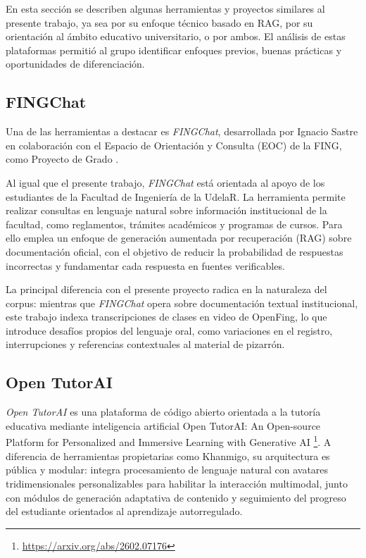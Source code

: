 En esta sección se describen algunas herramientas y proyectos similares al presente trabajo, ya sea por su enfoque técnico basado en RAG, por su orientación al ámbito educativo universitario, o por ambos. El análisis de estas plataformas permitió al grupo identificar enfoques previos, buenas prácticas y oportunidades de diferenciación.

\subsection{FINGChat}
\label{subsection:2-FINGChat}

Una de las herramientas a destacar es \textit{FINGChat}, desarrollada por Ignacio Sastre en colaboración con el Espacio de Orientación y Consulta (EOC) de la FING, como Proyecto de Grado \cite{sastre2024derivation}.

Al igual que el presente trabajo, \textit{FINGChat} está orientada al apoyo de los estudiantes de la Facultad de Ingeniería de la UdelaR. La herramienta permite realizar consultas en lenguaje natural sobre información institucional de la facultad, como reglamentos, trámites académicos y programas de cursos. Para ello emplea un enfoque de generación aumentada por recuperación (RAG) sobre documentación oficial, con el objetivo de reducir la probabilidad de respuestas incorrectas y fundamentar cada respuesta en fuentes verificables.

La principal diferencia con el presente proyecto radica en la naturaleza del corpus: mientras que \textit{FINGChat} opera sobre documentación textual institucional, este trabajo indexa transcripciones de clases en video de OpenFing, lo que introduce desafíos propios del lenguaje oral, como variaciones en el registro, interrupciones y referencias contextuales al material de pizarrón.

\subsection{Open TutorAI}
\label{subsection:2-OpenTutorAI}

\textit{Open TutorAI} es una plataforma de código abierto orientada a la tutoría educativa mediante inteligencia artificial Open {TutorAI}: An Open-source Platform for Personalized and Immersive Learning with Generative {AI} \footnote{\url{https://arxiv.org/abs/2602.07176}}. A diferencia de herramientas propietarias como Khanmigo, su arquitectura es pública y modular: integra procesamiento de lenguaje natural con avatares tridimensionales personalizables para habilitar la interacción multimodal, junto con módulos de generación adaptativa de contenido y seguimiento del progreso del estudiante orientados al aprendizaje autorregulado.

